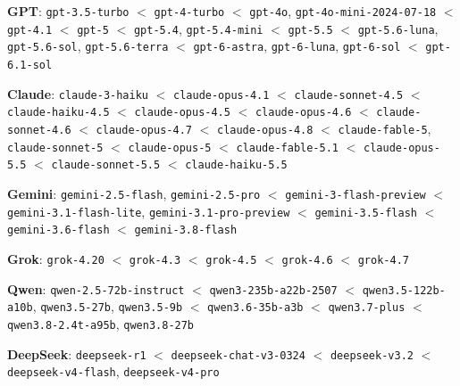 {\sloppy
\noindent\textbf{GPT}: \texttt{gpt-3.5-turbo} $<$ \texttt{gpt-4-turbo} $<$ \texttt{gpt-4o}, \texttt{gpt-4o-mini-2024-07-18} $<$ \texttt{gpt-4.1} $<$ \texttt{gpt-5} $<$ \texttt{gpt-5.4}, \texttt{gpt-5.4-mini} $<$ \texttt{gpt-5.5} $<$ \texttt{gpt-5.6-luna}, \texttt{gpt-5.6-sol}, \texttt{gpt-5.6-terra} $<$ \texttt{gpt-6-astra}, \texttt{gpt-6-luna}, \texttt{gpt-6-sol} $<$ \texttt{gpt-6.1-sol}\par\smallskip
\noindent\textbf{Claude}: \texttt{claude-3-haiku} $<$ \texttt{claude-opus-4.1} $<$ \texttt{claude-sonnet-4.5} $<$ \texttt{claude-haiku-4.5} $<$ \texttt{claude-opus-4.5} $<$ \texttt{claude-opus-4.6} $<$ \texttt{claude-sonnet-4.6} $<$ \texttt{claude-opus-4.7} $<$ \texttt{claude-opus-4.8} $<$ \texttt{claude-fable-5}, \texttt{claude-sonnet-5} $<$ \texttt{claude-opus-5} $<$ \texttt{claude-fable-5.1} $<$ \texttt{claude-opus-5.5} $<$ \texttt{claude-sonnet-5.5} $<$ \texttt{claude-haiku-5.5}\par\smallskip
\noindent\textbf{Gemini}: \texttt{gemini-2.5-flash}, \texttt{gemini-2.5-pro} $<$ \texttt{gemini-3-flash-preview} $<$ \texttt{gemini-3.1-flash-lite}, \texttt{gemini-3.1-pro-preview} $<$ \texttt{gemini-3.5-flash} $<$ \texttt{gemini-3.6-flash} $<$ \texttt{gemini-3.8-flash}\par\smallskip
\noindent\textbf{Grok}: \texttt{grok-4.20} $<$ \texttt{grok-4.3} $<$ \texttt{grok-4.5} $<$ \texttt{grok-4.6} $<$ \texttt{grok-4.7}\par\smallskip
\noindent\textbf{Qwen}: \texttt{qwen-2.5-72b-instruct} $<$ \texttt{qwen3-235b-a22b-2507} $<$ \texttt{qwen3.5-122b-a10b}, \texttt{qwen3.5-27b}, \texttt{qwen3.5-9b} $<$ \texttt{qwen3.6-35b-a3b} $<$ \texttt{qwen3.7-plus} $<$ \texttt{qwen3.8-2.4t-a95b}, \texttt{qwen3.8-27b}\par\smallskip
\noindent\textbf{DeepSeek}: \texttt{deepseek-r1} $<$ \texttt{deepseek-chat-v3-0324} $<$ \texttt{deepseek-v3.2} $<$ \texttt{deepseek-v4-flash}, \texttt{deepseek-v4-pro}\par\smallskip
}
